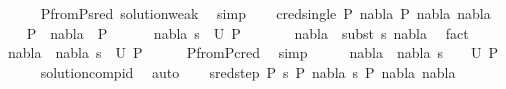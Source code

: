 \begin{isabellebody}
\ \ \ \ \isamarkupfalse%
\ P{}{\isacharunderscore}{\kern0pt}from{\isacharunderscore}{\kern0pt}P{}{\isacharunderscore}{\kern0pt}sred\ solution{\isacharunderscore}{\kern0pt}weak\ \isamarkupfalse%
\ simp\isanewline
{}\isamarkupfalse%
\isanewline
\ \ \isamarkupfalse%
\ {\isacharparenleft}{\kern0pt}cred{\isacharunderscore}{\kern0pt}single\ P{}\ nabla\ P{}\ nabla{}\ nabla{}{\isacharparenright}{\kern0pt}\isanewline
\ \ \isamarkupfalse%
\ {\isachardoublequoteopen}P{}\ {\isasymturnstile}\ nabla\ {\isasymrightarrow}\ P{}{\isachardoublequoteclose}\isanewline
\ \ \ \ \ \ {\isachardoublequoteopen}{\isacharparenleft}{\kern0pt}nabla{}{\isacharcomma}{\kern0pt}\ s{}{\isacharparenright}{\kern0pt}\ {\isasymin}\ U\ P{}{\isachardoublequoteclose}\ \isanewline
\ \ \ \ \ \ {\isachardoublequoteopen}nabla{}\ {\isasymTurnstile}\ {\isacharparenleft}{\kern0pt}subst\ s{}{\isacharparenright}{\kern0pt}\ nabla{\isachardoublequoteclose}\ \isamarkupfalse%
\ fact{\isacharplus}{\kern0pt}\isanewline
\ \ \isamarkupfalse%
\ {\isachardoublequoteopen}{\isacharparenleft}{\kern0pt}nabla{}\ {\isasymunion}\ nabla{}{\isacharcomma}{\kern0pt}\ s{}{\isacharparenright}{\kern0pt}\ {\isasymin}\ U\ P{}{\isachardoublequoteclose}\isanewline
\ \ \ \ \isamarkupfalse%
\ P{}{\isacharunderscore}{\kern0pt}from{\isacharunderscore}{\kern0pt}P{}{\isacharunderscore}{\kern0pt}cred\ \isamarkupfalse%
\ simp\isanewline
\ \ \isamarkupfalse%
\ \isamarkupfalse%
\ {\isachardoublequoteopen}{\isacharparenleft}{\kern0pt}nabla{}\ {\isasymunion}\ nabla{}{\isacharcomma}{\kern0pt}\ s{}\ {\isasymbullet}\ {\isacharbrackleft}{\kern0pt}{\isacharbrackright}{\kern0pt}{\isacharparenright}{\kern0pt}\ {\isasymin}\ U\ P{}{\isachardoublequoteclose}\isanewline
\ \ \ \ \isamarkupfalse%
\ solution{\isacharunderscore}{\kern0pt}comp{\isacharunderscore}{\kern0pt}id\ \isamarkupfalse%
\ auto\isanewline
{}\isamarkupfalse%
\isanewline
\ \ \isamarkupfalse%
\ {\isacharparenleft}{\kern0pt}sred{\isacharunderscore}{\kern0pt}step\ P{}\ s\ P{}\ nabla{}\ s{}\ P{}\ nabla{}\ nabla{}{\isacharparenright}{\kern0pt}\isanewline

\end{isabellebody}
